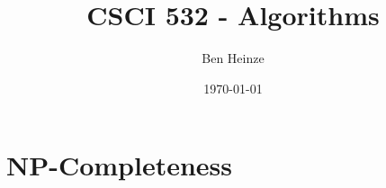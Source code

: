 \documentclass[11pt]{article}
\author{Ben Heinze}
\date{\today}
\title{CSCI 532 - Algorithms}
\begin{document}
\maketitle


\section{NP-Completeness}
\label{sec:orgb19a5a4}
\end{document}
